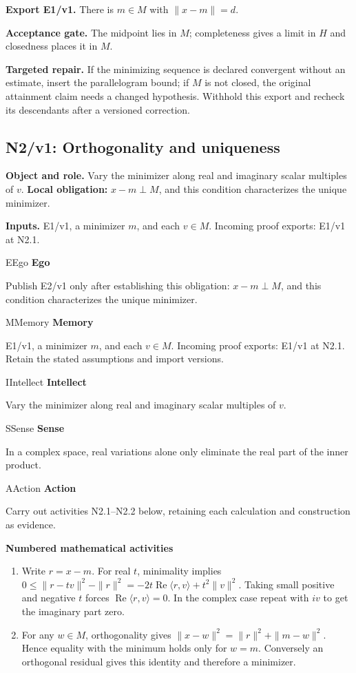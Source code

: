 \documentclass[preprint,12pt,aps,pra,showkeys,amsmath,amssymb,superscriptaddress,floatfix]{revtex4-2}
\theoremstyle{definition}
\theoremstyle{remark}
\newcommand{\mmfaculty}[3]{%
 \begin{mmfacultybox}{#1}{#2}
 {\sffamily\bfseries\color{MMBlue}#2}\par\smallskip #3
 \end{mmfacultybox}}
\newcommand{\field}[2]{\par\smallskip\noindent\textbf{#1.} #2\par}
\begin{document}
\field{Export E1/v1}{There is \(m\in M\) with \(\|x-m\|=d\).}

\field{Acceptance gate}{The midpoint lies in \(M\); completeness gives a limit in \(H\) and
closedness places it in \(M\).}

\field{Targeted repair}{If the minimizing sequence is declared convergent without an estimate,
insert the parallelogram bound; if \(M\) is not closed, the original
attainment claim needs a changed hypothesis. Withhold this export and
recheck its descendants after a versioned correction.}

\clearpage

\subsection{N2/v1: Orthogonality and uniqueness}

\field{Object and role}{Vary the minimizer along real and imaginary scalar multiples of \(v\).
\textbf{Local obligation:} \(x-m\perp M\), and this condition
characterizes the unique minimizer.}

\field{Inputs}{E1/v1, a minimizer \(m\), and each \(v\in M\). Incoming proof exports:
E1/v1 at N2.1.}

\mmfaculty{E}{Ego}{Publish E2/v1 only after establishing this obligation: \(x-m\perp M\),
and this condition characterizes the unique minimizer.}

\mmfaculty{M}{Memory}{E1/v1, a minimizer \(m\), and each \(v\in M\). Incoming proof exports:
E1/v1 at N2.1. Retain the stated assumptions and import versions.}

\mmfaculty{I}{Intellect}{Vary the minimizer along real and imaginary scalar multiples of \(v\).}

\mmfaculty{S}{Sense}{In a complex space, real variations alone only eliminate the real part
of the inner product.}

\mmfaculty{A}{Action}{Carry out activities N2.1--N2.2 below, retaining each calculation and
construction as evidence.}

\smallskip\noindent\textbf{Numbered mathematical activities}

\begin{enumerate}[label=N2.\arabic*,leftmargin=3.4em]

\item Write \(r=x-m\). For real \(t\), minimality implies
\(0\le\|r-tv\|^2-\|r\|^2=-2t\operatorname{Re}\langle r,v\rangle+t^2\|v\|^2\).
Taking small positive and negative \(t\) forces
\(\operatorname{Re}\langle r,v\rangle=0\). In the complex case repeat
with \(iv\) to get the imaginary part zero.

\item For any \(w\in M\), orthogonality gives \(\|x-w\|^2=\|r\|^2+\|m-w\|^2\).
Hence equality with the minimum holds only for \(w=m\). Conversely an
orthogonal residual gives this identity and therefore a minimizer.

\end{enumerate}
\end{document}
